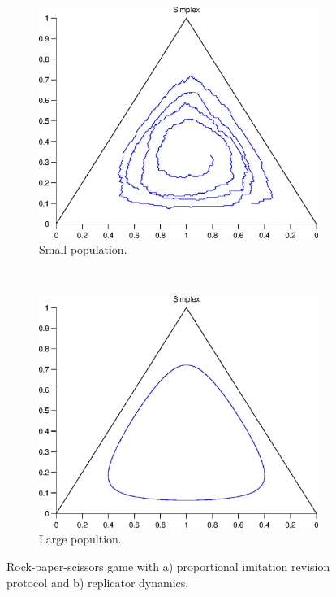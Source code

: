 \documentclass[a4paper,10pt]{article}
\begin{document}
\begin{figure}[th]
  \centering
  \begin{subfigure}[b]{0.4\textwidth}
	  \includegraphics[width=\textwidth]{./images/test_finite_proportional_imitation.eps}
	  \caption{Small population.}
	  \label{fig:finite1_protocol}
  \end{subfigure}
  ~ 
  \begin{subfigure}[b]{0.4\textwidth}
	  \includegraphics[width=\textwidth]{./images/test1_simplex_rd.eps}
	  \caption{Large popultion.}
	  \label{fig:finite1_dynamics}
  \end{subfigure}
  \caption{Rock-paper-scissors game with a) proportional imitation revision protocol and b) replicator dynamics.}
  \label{fig:finite1}
\end{figure}
\end{document}
